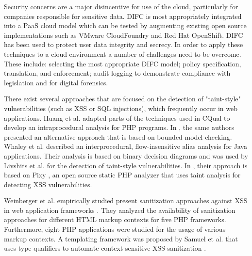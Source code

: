 Security concerns are a major disincentive for use of the
cloud, particularly for companies responsible for sensitive
data. DIFC \cite{ref_74_bacon2014information} is most appropriately integrated into a PaaS cloud model which can be tested by augmenting
existing open source implementations such as VMware CloudFoundry
and Red Hat OpenShift. DIFC has been used to protect user
data integrity and secrecy. In order to apply these techniques
to a cloud environment a number of challenges need to be
overcome. These include: selecting the most appropriate DIFC
model; policy specification, translation, and enforcement; audit
logging to demonstrate compliance with legislation and for
digital forensics.

There exist several approaches that are focused on the detection of "taint-style" vulnerabilities (such as XSS or SQL injections), which
frequently occur in web applications. Huang et al. \cite{ref_75_huang2004securing}
adapted parts of the techniques used in CQual to develop
an intraprocedural analysis for PHP programs. In \cite{ref_76_huang2004verifying}, the
same authors presented an alternative approach that is based
on bounded model checking. Whaley et al. \cite{ref_77_whaley2004cloning} described an interprocedural, flow-insensitive alias analysis for Java applications. Their analysis is based on binary decision diagrams and was used by Livshits et al. \cite{ref_78_livshits2005finding} for the detection of taint-style vulnerabilities. In \cite{ref_62_balzarotti2008saner}, their approach is based on Pixy \cite{ref_80_jovanovic2006precise,ref_79_jovanovic2010static}, an open
source static PHP analyzer that uses taint analysis for detecting XSS vulnerabilities.

Weinberger et al. empirically studied present sanitization
approaches against XSS in web application frameworks \cite{ref_105_weinberger2011systematic}.
They analyzed the availability of sanitization approaches for
different HTML markup contexts for five PHP frameworks.
Furthermore, eight PHP applications were studied for the
usage of various markup contexts. A templating framework
was proposed by Samuel et al. that uses type qualifiers
to automate context-sensitive XSS sanitization \cite{ref_106_samuel2011context}.

